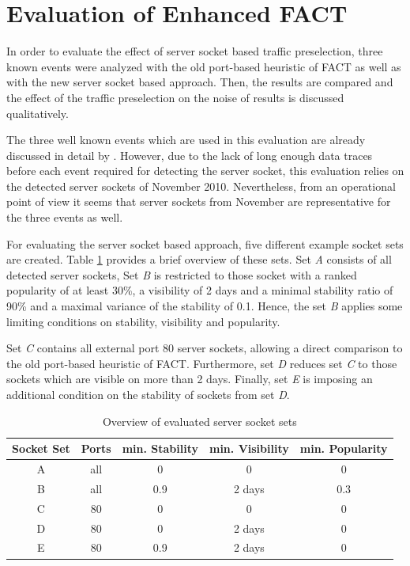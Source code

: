 \section{Evaluation of Enhanced FACT}
In order to evaluate the effect of \gls{server socket} based traffic preselection, three known events were analyzed with the old port-based heuristic of \gls{FACT} as well as with the new \gls{server socket} based approach. 
Then, the results are compared and the effect of the traffic preselection on the noise of results is discussed qualitatively.

The three well known events which are used in this evaluation are already discussed in detail by \citet{SchatzmannPAM2011}.
However, due to the lack of long enough data traces before each event required for detecting the \gls{server socket}, this evaluation relies on the detected \glspl{server socket} of November 2010. 
Nevertheless, from an operational point of view it seems that \glspl{server socket} from November are representative for the three events as well. 

For evaluating the \gls{server socket} based approach, five different example socket sets are created.
Table \ref{tab:ses_sets} provides a brief overview of these sets. Set \emph{A} consists of all detected \glspl{server socket}, Set \emph{B} is restricted to those socket with a ranked popularity of at least 30\%, a visibility of 2 days and a minimal stability ratio of 90\% and a maximal variance of the stability of 0.1. 
Hence, the set \emph{B} applies some limiting conditions on stability, visibility and popularity. 

Set \emph{C} contains all external port 80 \glspl{server socket}, allowing a direct comparison to the old port-based heuristic of \gls{FACT}. 
Furthermore, set \emph{D} reduces set \emph{C} to those sockets which are visible on more than 2 days. 
Finally, set \emph{E} is imposing an additional condition on the stability of sockets from set \emph{D}. 

\begin{table}
	[ht] \centering 
	\begin{tabular}
		{|c|c|c|c|c|} \hline \textbf{Socket Set} & \textbf{Ports} & \textbf{min. Stability} & \textbf{min. Visibility} & \textbf{min. Popularity} \\
		\hline \hline A & all & 0 & 0 & 0\\
		\hline B & all & 0.9 & 2 days & 0.3 \\
		\hline C & 80 & 0 & 0 & 0 \\
		\hline D & 80 & 0 & 2 days & 0 \\
		\hline E & 80 & 0.9 & 2 days & 0 \\
		\hline 
	\end{tabular}
	\caption{Overview of evaluated \gls{server socket} sets} 
	\label{tab:ses_sets} 
\end{table}

